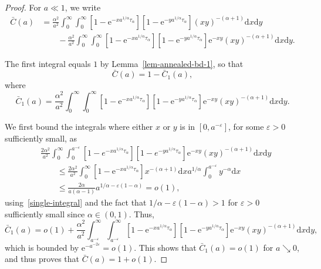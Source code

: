 \documentclass[ twocolumn,
 amsmath,amssymb,
 aps, pre, amsthm, amsfonts,
]{revtex4-2}
\newcommand{\e}{\mathrm{e}}
\newcommand{\nn}{\nonumber}
\begin{document}
\begin{proof}
    For $a\ll 1$, we write
\begin{align}
    \bar{C}(a)&=\frac{\alpha^2}{a^2} \int_{0}^{\infty} \int_{0}^{\infty}[1-\e^{-xa^{1/\alpha} {\tau_\alpha}}][1-\e^{-ya^{1/\alpha} {\tau_\alpha}}](xy)^{-(\alpha+1)}
	{\mathrm d}x {\mathrm d}y\\
	&\qquad-\frac{\alpha^2}{a^2} \int_{0}^{\infty} \int_{0}^{\infty}[1-\e^{-xa^{1/\alpha} {\tau_\alpha}}][1-\e^{-ya^{1/\alpha} {\tau_\alpha}}]\e^{-xy}(xy)^{-(\alpha+1)}
	{\mathrm d}x {\mathrm d}y.\nn
\end{align}

The first integral equals $1$ by Lemma~\ref{lem-annealed-bd-1}, so that
\begin{equation}
    \bar{C}(a) =1-\bar{C}_1(a),
\end{equation}
where
\begin{equation}
    \bar{C}_1(a)=\frac{\alpha^2}{a^2} \int_{0}^{\infty} \int_{0}^{\infty}[1-\e^{-xa^{1/\alpha} {\tau_\alpha}}][1-\e^{-ya^{1/\alpha} {\tau_\alpha}}]\e^{-xy}(xy)^{-(\alpha+1)}
	{\mathrm d}x {\mathrm d}y.
\end{equation}

We first bound the integrals where either $x$ or $y$ is in $[0,a^{-\varepsilon}]$, for some $\varepsilon>0$ sufficiently small, as 
\begin{align}
    &\frac{2\alpha^2}{a^2}\int_{0}^{\infty} \int_{0}^{a^{-\varepsilon}}[1-e^{-xa^{1/\alpha} {\tau_\alpha}}][1-e^{-ya^{1/\alpha} {\tau_\alpha}}]\e^{-xy}(xy)^{-(\alpha+1)}
	{\mathrm d}x {\mathrm d}y\\
    &\qquad \leq \frac{2\alpha^2}{a^2}\int_{0}^{\infty} [1-\e^{-xa^{1/\alpha} {\tau_\alpha}}] x^{-(\alpha+1)}{\mathrm d}x
	a^{1/\alpha} \int_{0}^{a^{-\varepsilon}} y^{-\alpha}{\mathrm d}x\nn\\
	&\qquad\leq \frac{2\alpha}{a(\alpha-1)} a^{1/\alpha-\varepsilon(1-\alpha)}=o(1),\nn
\end{align}
using~\eqref{single-integral} and the fact that $1/\alpha-\varepsilon(1-\alpha)>1$ for $\varepsilon>0$ sufficiently small since $\alpha\in (0,1)$. Thus,
\begin{equation}
    \bar{C}_1(a)=o(1)+\frac{\alpha^2}{a^2} \int_{a^{-\varepsilon}}^{\infty} \int_{a^{-\varepsilon}}^{\infty}[1-\e^{-xa^{1/\alpha} {\tau_\alpha}}][1-\e^{-ya^{1/\alpha} {\tau_\alpha}}] \e^{-xy}(xy)^{-(\alpha+1)}
	{\mathrm d}x {\mathrm d}y,
\end{equation}
which is bounded by $\e^{-a^{-2\varepsilon}}=o(1)$. This shows that $\bar{C}_1(a)=o(1)$ for $a\searrow 0$, and thus proves that $\bar{C}(a)=1+o(1)$.
\end{proof}
\end{document}
